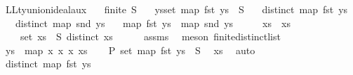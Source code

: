 \begin{isabellebody}
\isamarkupfalse%
%
\endisatagproof
{\isafoldproof}%
%
\isadelimproof
\isanewline
%
\endisadelimproof
\isanewline
\isanewline
\isanewline
{}\isamarkupfalse%
\ LLty{\isacharunderscore}{\kern0pt}union{\isacharunderscore}{\kern0pt}ideal{\isacharunderscore}{\kern0pt}aux{\isacharcolon}{\kern0pt}\isanewline
\ \ \ {\isachardoublequoteopen}finite\ S{\isachardoublequoteclose}\isanewline
\ \ \ {\isachardoublequoteopen}{\isasymexists}ys{\isachardot}{\kern0pt}{\isacharparenleft}{\kern0pt}set\ {\isacharparenleft}{\kern0pt}map\ fst\ ys{\isacharparenright}{\kern0pt}\ {\isacharequal}{\kern0pt}\ S\isanewline
\ \ {\isasymand}\ distinct\ {\isacharparenleft}{\kern0pt}map\ fst\ ys{\isacharparenright}{\kern0pt}\isanewline
\ \ {\isasymand}\ distinct\ {\isacharparenleft}{\kern0pt}map\ snd\ ys{\isacharparenright}{\kern0pt}\isanewline
\ \ {\isasymand}\ map\ fst\ ys\ {\isacharequal}{\kern0pt}\ map\ snd\ ys{\isacharparenright}{\kern0pt}{\isachardoublequoteclose}\isanewline
%
\isadelimproof
%
\endisadelimproof
%
\isatagproof
{}\isamarkupfalse%
\ {\isacharminus}{\kern0pt}\isanewline
\ \ \isamarkupfalse%
\ xs\ \ xs{\isacharcolon}{\kern0pt}\isanewline
\ \ \ \ {\isachardoublequoteopen}set\ xs\ {\isacharequal}{\kern0pt}\ S{\isachardoublequoteclose}\ {\isachardoublequoteopen}distinct\ xs{\isachardoublequoteclose}\isanewline
\ \ \ \ \isamarkupfalse%
\ assms\ \isamarkupfalse%
\ {\isacharparenleft}{\kern0pt}meson\ finite{\isacharunderscore}{\kern0pt}distinct{\isacharunderscore}{\kern0pt}list{\isacharparenright}{\kern0pt}\isanewline
\isanewline
\ \ \isamarkupfalse%
\ {\isacharquery}{\kern0pt}ys\ {\isacharequal}{\kern0pt}\ {\isachardoublequoteopen}map\ {\isacharparenleft}{\kern0pt}{\isasymlambda}x{\isachardot}{\kern0pt}\ {\isacharparenleft}{\kern0pt}x{\isacharcomma}{\kern0pt}\ x{\isacharparenright}{\kern0pt}{\isacharparenright}{\kern0pt}\ xs{\isachardoublequoteclose}\isanewline
\isanewline
\ \ \isamarkupfalse%
\ P{}{\isacharcolon}{\kern0pt}\ {\isachardoublequoteopen}set\ {\isacharparenleft}{\kern0pt}map\ fst\ {\isacharquery}{\kern0pt}ys{\isacharparenright}{\kern0pt}\ {\isacharequal}{\kern0pt}\ S{\isachardoublequoteclose}\ \isamarkupfalse%
\ xs\ \isamarkupfalse%
\ auto\isanewline
\ \ \isamarkupfalse%
\ \isamarkupfalse%
\ {\isachardoublequoteopen}distinct\ {\isacharparenleft}{\kern0pt}map\ fst\ {\isacharquery}{\kern0pt}ys{\isacharparenright}{\kern0pt}{\isachardoublequoteclose}\isanewline

\end{isabellebody}
